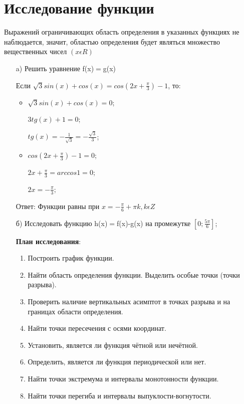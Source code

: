 \documentclass[russian,utf8,nocolumnxxxi,nocolumnxxxii]{eskdtext}
\begin{document}
\newpage
\section{Исследование функции}

Выражений ограничивающих область определения в указанных функциях не наблюдается, значит, областью определения будет являться множество вещественных чисел $(x \epsilon R)$
\begin{enumerate}
    \item[a)]Решить уравнение f(x)$=$g(x)
    
   Если $\sqrt{3}sin(x)+cos(x)=cos(2x+\frac{\pi}{3})-1$,
   то:
   \begin{itemize}
   \renewcommand{\labelitemi}{$\bullet$}
       \item $\sqrt{3}sin(x)+cos(x)=0$;
       
       $3tg(x)+1=0$;
       
       $tg(x)=-\frac{1}{\sqrt{3}}=-\frac{\sqrt{3}}{3}$;
       
       \item $cos(2x+\frac{\pi}{3})-1=0$;
       
       $2x+\frac{\pi}{3}=arccos 1=0$;
       
       $2x=-\frac{\pi}{3}$;

   \end{itemize}
   
 Ответ: Функции равны при $x=-\frac{\pi}{6}+\pi k,  k \epsilon Z$
    
    \item[б)] Исследовать функцию h(x)$=$f(x)-g(x) на промежутке $[0;\frac{5\pi}{6}]$;
    
        \textbf{План исследования}:
    \begin{enumerate}
        \item Построить график функции.
        \item Найти область определения функции. Выделить особые точки (точки разрыва). 
        \item Проверить наличие вертикальных асимптот в точках разрыва и на границах области определения.
        \item Найти точки пересечения с осями координат.
        \item Установить, является ли функция чётной или нечётной.
        \item Определить, является ли функция периодической или нет. 
        \item Найти точки экстремума и интервалы монотонности функции.
        \item Найти точки перегиба и интервалы выпуклости-вогнутости.
         

\end{enumerate}
\end{enumerate}
\end{document}
